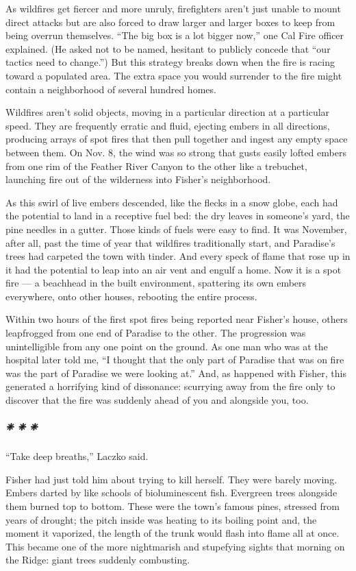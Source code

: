 As wildfires get fiercer and more unruly, firefighters aren't just
unable to mount direct attacks but are also forced to draw larger and
larger boxes to keep from being overrun themselves. ``The big box is a
lot bigger now,'' one Cal Fire officer explained. (He asked not to be
named, hesitant to publicly concede that ``our tactics need to
change.'') But this strategy breaks down when the fire is racing toward
a populated area. The extra space you would surrender to the fire might
contain a neighborhood of several hundred homes.

Wildfires aren't solid objects, moving in a particular direction at a
particular speed. They are frequently erratic and fluid, ejecting embers
in all directions, producing arrays of spot fires that then pull
together and ingest any empty space between them. On Nov. 8, the wind
was so strong that gusts easily lofted embers from one rim of the
Feather River Canyon to the other like a trebuchet, launching fire out
of the wilderness into Fisher's neighborhood.

As this swirl of live embers descended, like the flecks in a snow globe,
each had the potential to land in a receptive fuel bed: the dry leaves
in someone's yard, the pine needles in a gutter. Those kinds of fuels
were easy to find. It was November, after all, past the time of year
that wildfires traditionally start, and Paradise's trees had carpeted
the town with tinder. And every speck of flame that rose up in it had
the potential to leap into an air vent and engulf a home. Now it is a
spot fire --- a beachhead in the built environment, spattering its own
embers everywhere, onto other houses, rebooting the entire process.

Within two hours of the first spot fires being reported near Fisher's
house, others leapfrogged from one end of Paradise to the other. The
progression was unintelligible from any one point on the ground. As one
man who was at the hospital later told me, ``I thought that the only
part of Paradise that was on fire was the part of Paradise we were
looking at.'' And, as happened with Fisher, this generated a horrifying
kind of dissonance: scurrying away from the fire only to discover that
the fire was suddenly ahead of you and alongside you, too.

\hypertarget{---7}{%
\subparagraph{❈ ❈ ❈}\label{---7}}

``Take deep breaths,'' Laczko said.

Fisher had just told him about trying to kill herself. They were barely
moving. Embers darted by like schools of bioluminescent fish. Evergreen
trees alongside them burned top to bottom. These were the town's famous
pines, stressed from years of drought; the pitch inside was heating to
its boiling point and, the moment it vaporized, the length of the trunk
would flash into flame all at once. This became one of the more
nightmarish and stupefying sights that morning on the Ridge: giant trees
suddenly combusting.

